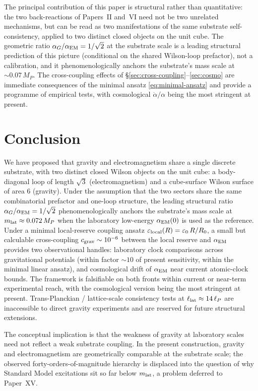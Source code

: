 \documentclass[11pt,a4paper]{article}
\begin{document}
The principal contribution of this paper is structural rather
than quantitative: the two back-reactions of Papers~II and~VI
need not be two unrelated mechanisms, but can be read as two
manifestations of the same substrate self-consistency, applied
to two distinct closed objects on the unit cube. The
geometric ratio $\alpha_G/\alpha_{\rm EM} = 1/\sqrt{2}$ at the
substrate scale is a leading structural prediction of this
picture (conditional on the shared Wilson-loop prefactor), not a
calibration, and it phenomenologically anchors the substrate's
mass scale at $\sim 0.07\,M_P$. The cross-coupling effects of
\S\ref{sec:cross-coupling}--\ref{sec:cosmo} are immediate
consequences of the minimal ansatz \eqref{eq:minimal-ansatz}
and provide a programme of empirical tests, with cosmological
$\dot\alpha/\alpha$ being the most stringent at present.

\section{Conclusion}
\label{sec:conclusion}

We have proposed that gravity and electromagnetism share a
single discrete substrate, with two distinct closed Wilson
objects on the unit cube: a body-diagonal loop of length
$\sqrt{3}$ (electromagnetism) and a cube-surface Wilson surface
of area $6$ (gravity). Under the assumption that the two
sectors share the same combinatorial prefactor and one-loop
structure, the leading structural ratio $\alpha_G/\alpha_{\rm
EM} = 1/\sqrt{2}$ phenomenologically anchors the substrate's
mass scale at $m_{\rm lat} \approx 0.072\,M_P$ when the
laboratory low-energy $\alpha_{\rm EM}(0)$ is used as the
reference. Under a minimal local-reserve coupling ansatz
$\varepsilon_{\rm local}(R) = \varepsilon_0\,R/R_0$, a small but
calculable cross-coupling $c_{\rm grav}\sim 10^{-6}$ between the
local reserve and $\alpha_{\rm EM}$ provides two observational
handles: laboratory clock comparisons across gravitational
potentials (within factor $\sim 10$ of present sensitivity,
within the minimal linear ansatz), and cosmological drift of
$\alpha_{\rm EM}$ near current atomic-clock bounds. The
framework is falsifiable on both fronts within current or
near-term experimental reach, with the cosmological version
being the most stringent at present. Trans-Planckian /
lattice-scale consistency tests at $\ell_{\rm lat} \approx
14\,\ell_P$ are inaccessible to direct gravity experiments and
are reserved for future structural extensions.

The conceptual implication is that the weakness of gravity at
laboratory scales need not reflect a weak substrate coupling.
In the present construction, gravity and electromagnetism are
geometrically comparable at the substrate scale; the observed
forty-orders-of-magnitude hierarchy is displaced into the
question of why Standard Model excitations sit so far below
$m_{\rm lat}$, a problem deferred to Paper~XV.
\end{document}
